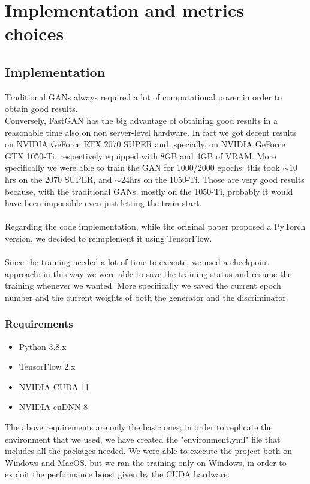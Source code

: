 \documentclass[12pt]{article}
\begin{document}

\section{Implementation and metrics choices}
\large

\subsection{Implementation}

Traditional GANs always required a lot of computational power in order to obtain good results.\\
Conversely, FastGAN has the big advantage of obtaining good results in a reasonable time also on non server-level hardware.
In fact we got decent results on NVIDIA GeForce RTX 2070 SUPER and, specially, on NVIDIA GeForce GTX 1050-Ti, 
respectively equipped with 8GB and 4GB of VRAM. More specifically we were able to train the GAN for 1000/2000 epochs: this
took $\sim10$hrs on the 2070 SUPER, and $\sim24$hrs on the 1050-Ti. Those are very good results because, with the traditional
GANs, mostly on the 1050-Ti, probably it would have been impossible even just letting the train start.\\\\
Regarding the code implementation, while the original paper proposed a PyTorch version, we decided to reimplement it using 
TensorFlow.\\\\
Since the training needed a lot of time to execute, we used a checkpoint approach: in this way 
we were able to save the training status and resume the training whenever we wanted. 
More specifically we saved the current epoch number and the current weights of both the generator and
the discriminator. 

\subsubsection{Requirements}
\large

\begin{itemize}
	\item Python 3.8.x
	\item TensorFlow 2.x
	\item NVIDIA CUDA 11
	\item NVIDIA cuDNN 8
\end{itemize}
The above requirements are only the basic ones; in order to replicate the environment that we used, we have created
the "environment.yml" file that includes all the packages needed.
We were able to execute the project both on Windows and MacOS, but we ran the training only on Windows, 
in order to exploit the performance boost given by the CUDA hardware.
\end{document}

